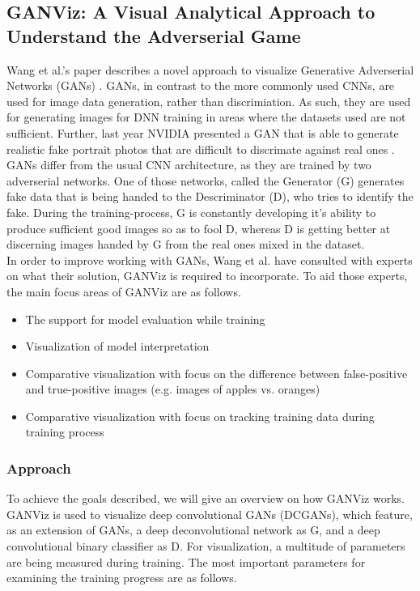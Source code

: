\documentclass{acmsiggraph}               %
\begin{document}
\subsection{GANViz: A Visual Analytical Approach to Understand the Adverserial Game}
Wang et al.'s paper describes a novel approach to visualize Generative Adverserial Networks (GANs) \protect\cite{Wang}. GANs, in contrast to the more commonly used CNNs, are used for image data generation, rather than discrimiation. As such, they are used for generating images for DNN training in areas where the datasets used are not sufficient. Further, last year NVIDIA presented a GAN that is able to generate realistic fake portrait photos that are difficult to discrimate against real ones \protect\cite{KarrasNVIDIA}. 
GANs differ from the usual CNN architecture, as they are trained by two adverserial networks. One of those networks, called the Generator (G) generates fake data that is being handed to the Descriminator (D), who tries to identify the fake. During the training-process, G is constantly developing it's ability to produce sufficient good images so as to fool D, whereas D is getting better at discerning images handed by G from the real ones mixed in the dataset.\\

In order to improve working with GANs, Wang et al. have consulted with experts on what their solution, GANViz is required to incorporate. To aid those experts, the main focus areas of GANViz are as follows.

\begin{itemize}
  \item The support for model evaluation while training
  \item Visualization of model interpretation
  \item Comparative visualization with focus on the difference between false-positive and true-positive images (e.g. images of apples vs. oranges)
  \item Comparative visualization with focus on tracking training data during training process
\end{itemize}

\subsubsection{Approach}
To achieve the goals described, we will give an overview on how GANViz works. GANViz is used to visualize deep convolutional GANs (DCGANs), which feature, as an extension of GANs, a deep deconvolutional network as G, and a deep convolutional binary classifier as D. For visualization, a multitude of parameters are being measured during training. The most important parameters for examining the training progress are as follows.
\end{document}
